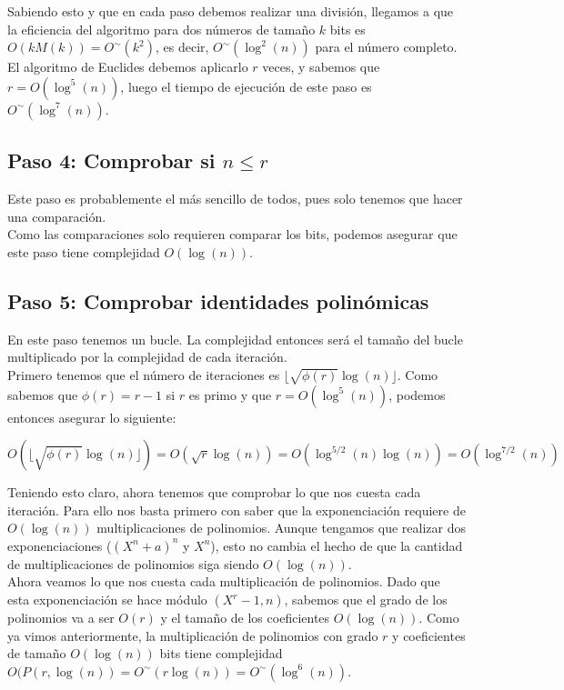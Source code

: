 Sabiendo esto y que en cada paso debemos realizar una división, llegamos a que la eficiencia del algoritmo para dos números de tamaño $k$ bits es $O(kM(k)) = O^\sim(k^2)$, es decir, $O^\sim(\log^2(n))$ para el número completo.\\

El algoritmo de Euclides debemos aplicarlo $r$ veces, y sabemos que $r = O(\log^5(n))$, luego el tiempo de ejecución de este paso es $O^\sim(\log^7(n))$.

\subsection{Paso 4: Comprobar si $n \leq r$}

Este paso es probablemente el más sencillo de todos, pues solo tenemos que hacer una comparación.\\

Como las comparaciones solo requieren comparar los bits, podemos asegurar que este paso tiene complejidad $O(\log(n))$.

\subsection{Paso 5: Comprobar identidades polinómicas}

En este paso tenemos un bucle. La complejidad entonces será el tamaño del bucle multiplicado por la complejidad de cada iteración.\\

Primero tenemos que el número de iteraciones es $\lfloor \sqrt{\phi(r)}\log(n) \rfloor$. Como sabemos que $\phi(r) = r-1$ si $r$ es primo y que $r = O(\log^5(n))$, podemos entonces asegurar lo siguiente:

$$O\left(\lfloor \sqrt{\phi(r)}\log(n) \rfloor\right) = O(\sqrt{r}\log(n)) = O(\log^{5/2}(n)\log(n)) = O(\log^{7/2}(n))$$

Teniendo esto claro, ahora tenemos que comprobar lo que nos cuesta cada iteración. Para ello nos basta primero con saber que la exponenciación requiere de $O(\log(n))$ multiplicaciones de polinomios. Aunque tengamos que realizar dos exponenciaciones ($(X^n + a)^n$ y $X^n$), esto no cambia el hecho de que la cantidad de multiplicaciones de polinomios siga siendo $O(\log(n))$.\\

Ahora veamos lo que nos cuesta cada multiplicación de polinomios. Dado que esta exponenciación se hace módulo $(X^r - 1, n)$, sabemos que el grado de los polinomios va a ser $O(r)$ y el tamaño de los coeficientes $O(\log(n))$. Como ya vimos anteriormente, la multiplicación de polinomios con grado $r$ y coeficientes de tamaño $O(\log(n))$ bits tiene complejidad $O(P(r, \log(n)) = O^\sim(r\log(n)) = O^\sim(\log^6(n))$.\\

